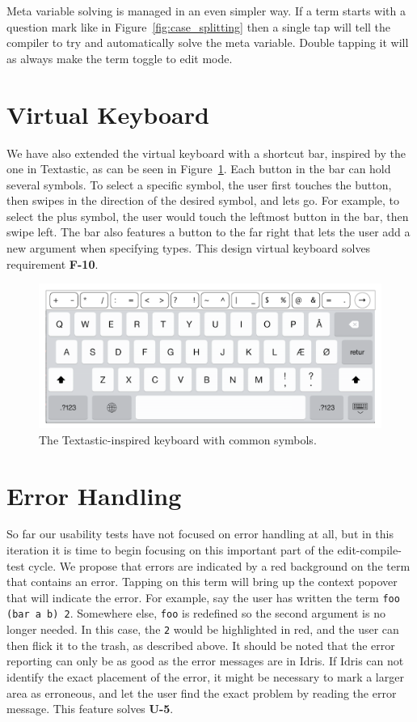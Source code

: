 Meta variable solving is managed in an even simpler way. If a term starts with
a question mark like in Figure~\ref{fig:case_splitting} then a single tap will
tell the compiler to try and automatically solve the meta variable. Double
tapping it will as always make the term toggle to edit mode.

\section{Virtual Keyboard}
\label{subsec:virtual_keyboard}
We have also extended the virtual keyboard with a shortcut bar, inspired by the one in Textastic, as can be seen in Figure~\ref{fig:design_keyboard}.
Each button in the bar can hold several symbols.
To select a specific symbol, the user first touches the button, then swipes in the direction of the desired symbol, and lets go.
For example, to select the plus symbol, the user would touch the leftmost button in the bar, then swipe left.
The bar also features a button to the far right that lets the user add a new argument when specifying types. 
This design virtual keyboard solves requirement \textbf{F-10}. 

\begin{figure}
	\centering
		\includegraphics[width=115mm]{diagrams/design_keyboard.pdf}
	\caption{The Textastic-inspired keyboard with common symbols.}
\label{fig:design_keyboard}
\end{figure}

\section{Error Handling}
\label{subsec:error_handling}
So far our usability tests have not focused on error handling at all, but in this iteration it is time to begin focusing on this important part of the edit-compile-test cycle.
We propose that errors are indicated by a red background on the term that contains an error. 
Tapping on this term will bring up the context popover that will indicate the error.
For example, say the user has written the term \texttt{foo (bar a b) 2}.
Somewhere else, \texttt{foo} is redefined so the second argument is no longer needed.
In this case, the \texttt{2} would be highlighted in red, and the user can then flick it to the trash, as described above.
It should be noted that the error reporting can only be as good as the error messages are in Idris.
If Idris can not identify the exact placement of the error, it might be necessary to mark a larger area as erroneous, and let the user find the exact problem by reading the error message.
This feature solves \textbf{U-5}.

